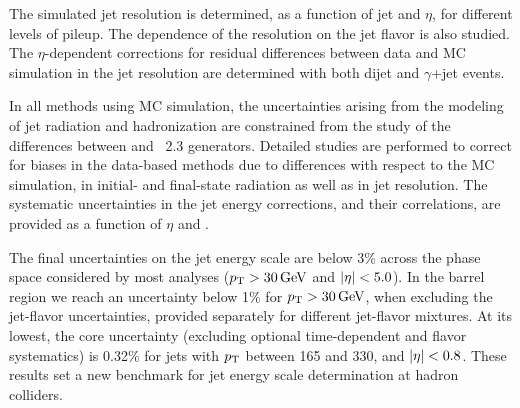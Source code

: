 \documentclass[11pt,twoside,a4paper,cmspaper,final,collab]{cms-tdr}
\begin{document}
The simulated jet \pt resolution is determined, as a function of jet \pt and $\eta$, for different levels of pileup.
The dependence of the resolution on the jet flavor is also studied. The $\eta$-dependent corrections for residual differences between data
and MC simulation in the jet resolution are determined with both dijet and $\gamma$+jet events.

In all methods using MC simulation,
the uncertainties arising from the modeling of jet radiation and hadronization are
constrained from the study of the differences between  and \HERWIGpp~2.3 generators.
Detailed studies are performed to correct for biases in the data-based methods due to differences with respect to the MC simulation, in initial- and final-state radiation as well as in jet \pt resolution.
The systematic uncertainties in the jet energy corrections, and their correlations, are provided as a function of $\eta$ and \pt.

The final uncertainties on the jet energy scale are below 3\% across the phase space considered by most analyses ($p_{\mathrm{T}}>30\,\text{Ge\hspace{-.08em}V}$ and $\lvert \eta \rvert<5.0$).
In the barrel region we reach an uncertainty below 1\% for $p_{\mathrm{T}}>30\,\text{Ge\hspace{-.08em}V}$, when excluding the jet-flavor uncertainties, provided separately
for different jet-flavor mixtures. At its lowest, the core uncertainty (excluding optional time-dependent and flavor systematics) is 0.32\% for jets with
$p_{\mathrm{T}}$ between 165 and 330\GeV, and $\lvert \eta \rvert<0.8$. These results set a new benchmark for jet energy scale determination at hadron colliders.
\end{document}
